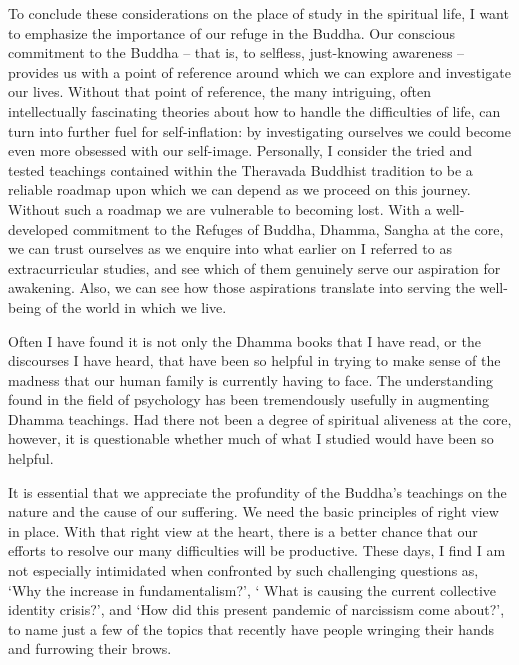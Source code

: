 To conclude these considerations on the place of study in the spiritual
life, I want to emphasize the importance of our refuge in the Buddha.
Our conscious commitment to the Buddha -- that is, to selfless,
just-knowing awareness -- provides us with a point of reference around
which we can explore and investigate our lives. Without that point of
reference, the many intriguing, often intellectually fascinating
theories about how to handle the difficulties of life, can turn into
further fuel for self-inflation: by investigating ourselves we could
become even more obsessed with our self-image. Personally, I consider
the tried and tested teachings contained within the Theravada Buddhist
tradition to be a reliable roadmap upon which we can depend as we
proceed on this journey. Without such a roadmap we are vulnerable to
becoming lost. With a well-developed commitment to the Refuges of
Buddha, Dhamma, Sangha at the core, we can trust ourselves as we enquire
into what earlier on I referred to as extracurricular studies, and see
which of them genuinely serve our aspiration for awakening. Also, we can
see how those aspirations translate into serving the well-being of the
world in which we live.

Often I have found it is not only the Dhamma books that I have read, or
the discourses I have heard, that have been so helpful in trying to make
sense of the madness that our human family is currently having to face.
The understanding found in the field of psychology has been tremendously
usefully in augmenting Dhamma teachings. Had there not been a degree of
spiritual aliveness at the core, however, it is questionable whether
much of what I studied would have been so helpful.

\enlargethispage*{\baselineskip}

It is essential that we appreciate the profundity of the Buddha's
teachings on the nature and the cause of our suffering. We need the
basic principles of right view in place. With that right view at the
heart, there is a better chance that our efforts to resolve our many
difficulties will be productive. These days, I find I am not especially
intimidated when confronted by such challenging questions as, `Why the
increase in fundamentalism?', ` What is causing the current collective
identity crisis?', and `How did this present pandemic of narcissism come
about?', to name just a few of the topics that recently have people
wringing their hands and furrowing their brows.

